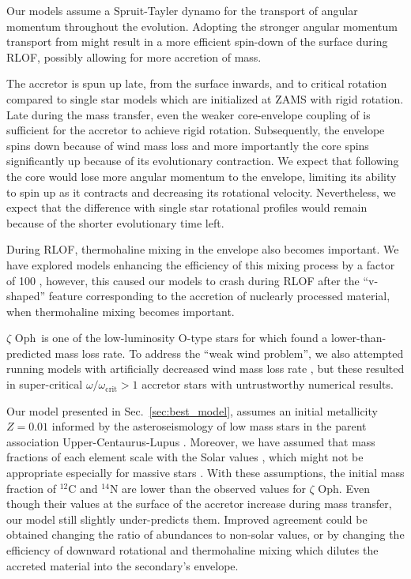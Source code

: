 \documentclass[twocolumn,twocolappendix,trackchanges]{aastex63}
\DeclareRobustCommand{\Secref}[1]{Sec.~\ref{#1}}
\newcommand{\zoph}{$\zeta$ Oph}
\begin{document}
Our models assume a Spruit-Tayler dynamo \citep{spruit:02} for the
transport of angular momentum throughout the evolution. Adopting the
stronger angular momentum transport from \cite{fuller:19} might result
in a more efficient spin-down of the surface during RLOF, possibly
allowing for more accretion of mass.

The accretor is spun up late, from the surface inwards, and to
critical rotation compared to single star models which are initialized
at ZAMS with rigid rotation. Late during the mass transfer, even the
weaker core-envelope coupling of \cite{spruit:02} is sufficient for
the accretor to achieve rigid rotation. Subsequently, the envelope
spins down because of wind mass loss and more importantly the core
spins significantly up because of its evolutionary contraction. We
expect that following \cite{fuller:19} the core would lose more
angular momentum to the envelope, limiting its ability to spin up as
it contracts and decreasing its rotational velocity.
Nevertheless, we expect that the difference with single star
rotational profiles would remain because of the shorter evolutionary time left.

During RLOF, thermohaline mixing in the envelope also becomes
important. We have explored models enhancing the efficiency of this
mixing process by a factor of 100 \citep{schootemeijer:19}, however,
this caused our models to crash during RLOF after the ``v-shaped''
feature corresponding to the accretion of nuclearly processed
material, when thermohaline mixing becomes important.

\zoph\ is one of the low-luminosity O-type stars for which
\cite{marcolino:09} found a lower-than-predicted mass loss rate.
To address the ``weak wind problem'', we also attempted
running models with artificially decreased wind mass loss rate
\citep[e.g.,][]{renzo:17}, but these resulted in super-critical
$\omega/\omega_\mathrm{crit}>1$ accretor stars with untrustworthy
numerical results.

Our model presented in \Secref{sec:best_model}, assumes an initial
metallicity $Z=0.01$ informed by the asteroseismology of low mass
stars in the parent association Upper-Centaurus-Lupus
\citep[e.g.,][]{murphy:21}. Moreover, we have assumed that mass
fractions of each element scale with the Solar values
\citep{grevesse:98}, which might not be appropriate especially for
massive stars \citep[e.g.,][]{grasha:21}. With these assumptions, the
initial mass fraction of $^{12}\mathrm{C}$ and $^{14}\mathrm{N}$ are
lower than the observed values for \zoph. Even though their values at
the surface of the accretor increase during mass transfer, our model
still slightly under-predicts them. Improved agreement could be
obtained changing the ratio of abundances to non-solar values, or by
changing the efficiency of downward rotational and thermohaline mixing
which dilutes the accreted material into the secondary's envelope.
\end{document}
